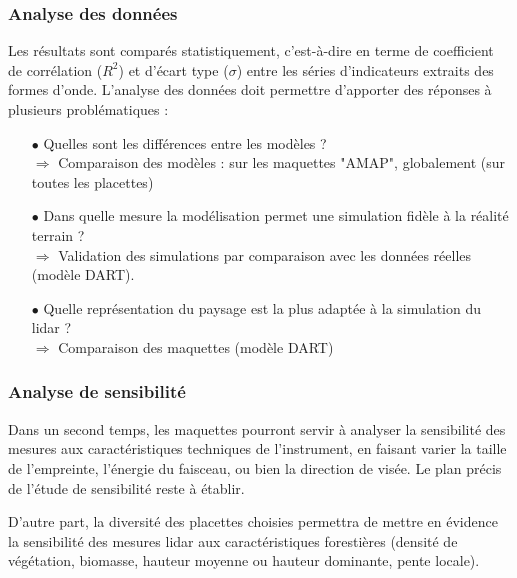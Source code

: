 \documentclass[a4paper,11pt]{article}
\begin{document}
\subsubsection{Analyse des données}
Les résultats sont comparés statistiquement, c'est-à-dire en terme de coefficient de corrélation ($R^2$) et d'écart type ($\sigma$) entre les séries d'indicateurs extraits des formes d'onde. L'analyse des données doit permettre d'apporter des réponses à plusieurs problématiques :

\begin{itemize}
\setlength{\itemsep}{0.1cm}%
\item[$\bullet$] Quelles sont les différences entre les modèles ?\\
{\small$\Rightarrow$} Comparaison des modèles :  sur les maquettes "AMAP", globalement (sur toutes les placettes) 
\item[$\bullet$] Dans quelle mesure la modélisation permet une simulation fidèle à la réalité terrain ?\\
{\small$\Rightarrow$} Validation des simulations par comparaison avec les données réelles (modèle DART). 
\item[$\bullet$]  Quelle représentation du paysage est la plus adaptée à la simulation du lidar ? \\
{\small$\Rightarrow$} Comparaison des maquettes (modèle DART)
\end{itemize}


\subsubsection{Analyse de sensibilité}
Dans un second temps, les maquettes pourront servir à analyser la sensibilité des mesures aux caractéristiques techniques de l'instrument, en faisant varier la taille de l'empreinte, l'énergie du faisceau, ou bien la direction de visée. Le plan précis de l'étude de sensibilité reste à établir.


D'autre part, la diversité des placettes choisies permettra de mettre en évidence la sensibilité des mesures lidar aux caractéristiques forestières (densité de végétation, biomasse, hauteur moyenne ou hauteur dominante, pente locale).

\newpage
\end{document}
